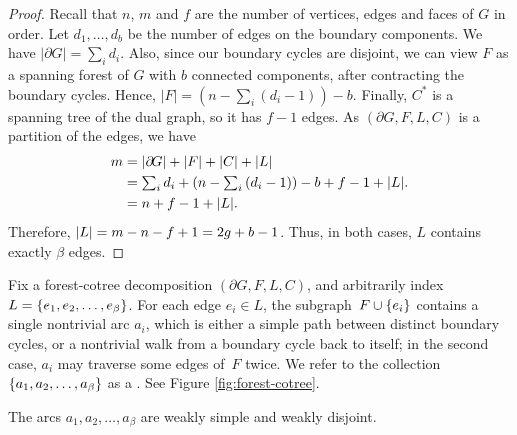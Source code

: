 \documentclass[letterpaper,review]{siamart190516}
\begin{document}
\begin{proof}
Recall that $n$, $m$ and $f$ are the number of vertices, edges and faces of $G$ in order.
Let $d_1, \ldots, d_b$ be the number of edges on the boundary components.  
We have $|\partial\! G| = \sum_i {d_i}$.
Also, since our boundary cycles are disjoint, we can view $F$ as a spanning forest of $G$ with $b$ connected components, after contracting the boundary cycles.  Hence, $|F| = (n - \sum_i{(d_i-1)}) - b$.  Finally, $C^*$ is a spanning tree of the dual graph, so it has $f-1$ edges. As $(\partial\! G, F, L, C)$ is a partition of the edges, we have
\begin{align*}
	m &= \mathopen| \partial\! G \mathclose| + \mathopen| F \mathclose| + \mathopen| C \mathclose| + \mathopen| L \mathclose|
\\	&= \textstyle \sum_i d_i + (n - \sum_i{(d_i-1)}) - b + f-1 + \mathopen| L \mathclose|.
\\	&= n + f-1 + \mathopen| L \mathclose|.
\end{align*}
Therefore, $\mathopen| L \mathclose| = m - n - f + 1 = 2g + b - 1$.  Thus, in both cases, $L$ contains exactly $\beta$ edges.
\end{proof}

Fix a forest-cotree decomposition $(\partial\! G, F, L, C)$, and arbitrarily index $L = \{ e_1, e_2, \dots, e_\beta \}$.  For each edge $e_i\in L$, the subgraph~$F\cup \{ e_i \}$ contains a single nontrivial arc $a_i$, which is either a simple path between distinct boundary cycles, or a nontrivial walk from a boundary cycle back to itself; in the second case, $a_i$ may traverse some edges of~$F$ twice.  We refer to the collection $\{ a_1, a_2, \dots, a_\beta \}$ as a .  See Figure \ref{fig:forest-cotree}.

\begin{lemma}
The arcs $a_1, a_2, \dots, a_\beta$ are weakly simple and weakly disjoint.
\end{lemma}
\end{document}
